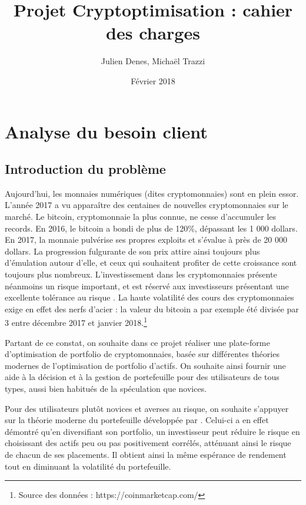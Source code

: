 \documentclass[a4paper]{article}
\title{Projet Cryptoptimisation : cahier des charges}
\author[]{Julien Denes, Michaël Trazzi}
\affil[]{Faculté des Sciences et Ingénierie -- Sorbonne Université}
\date{Février 2018}
\begin{document}
\maketitle

\section{Analyse du besoin client}

\subsection{Introduction du problème}

Aujourd’hui, les monnaies numériques (dites cryptomonnaies) sont en plein essor. L'année 2017 a vu apparaître des centaines de nouvelles cryptomonnaies sur le marché. Le bitcoin, cryptomonnaie la plus connue, ne cesse d’accumuler les records. En 2016, le bitcoin a bondi de plus de 120\%, dépassant les 1 000 dollars. En 2017, la monnaie pulvérise ses propres exploits et s'évalue à près de 20 000 dollars. La progression fulgurante de son prix attire ainsi toujours plus d'émulation autour d'elle, et ceux qui souhaitent profiter de cette croissance sont toujours plus nombreux. L’investissement dans les cryptomonnaies présente néanmoins un risque important, et est réservé aux investisseurs présentant une excellente tolérance au risque \cite{Elendner2018}. La haute volatilité des cours des cryptomonnaies exige en effet des nerfs d’acier : la valeur du bitcoin a par exemple été divisée par 3 entre décembre 2017 et janvier 2018.\footnote{Source des données : https://coinmarketcap.com/}

Partant de ce constat, on souhaite dans ce projet réaliser une plate-forme d’optimisation de portfolio de cryptomonnaies, basée sur différentes théories modernes de l'optimisation de portfolio d'actifs. On souhaite ainsi fournir une aide à la décision et à la gestion de portefeuille pour des utilisateurs de tous types, aussi bien habitués de la spéculation que novices.

Pour des utilisateurs plutôt novices et averses au risque, on souhaite s'appuyer sur la théorie moderne du portefeuille développée par \citet{Markovitz1952}. Celui-ci a en effet démontré qu'en diversifiant son portfolio, un investisseur peut réduire le risque en choisissant des actifs peu ou pas positivement corrélés, atténuant ainsi le risque de chacun de ses placements. Il obtient ainsi la même espérance de rendement tout en diminuant la volatilité du portefeuille.
\end{document}
